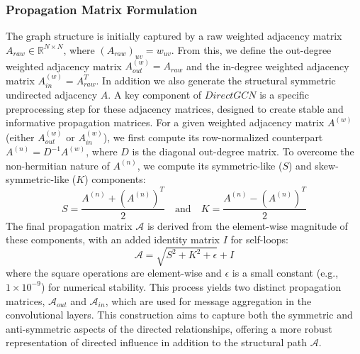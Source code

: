 \documentclass[utf8]{article}
\begin{document}
	\subsubsection{Propagation Matrix Formulation}
	The graph structure is initially captured by a raw weighted adjacency matrix $A_{raw} \in \mathbb{R}^{N \times N}$, where $(A_{raw})_{uv} = w_{uv}$. From this, we define the out-degree weighted adjacency matrix $A_{out}^{(w)} = A_{raw}$ and the in-degree weighted adjacency matrix $A_{in}^{(w)} = A_{raw}^T$. In addition we also generate the structural symmetric undirected adjacency $A$. A key component of $DirectGCN$ is a specific preprocessing step for these adjacency matrices, designed to create stable and informative propagation matrices. For a given weighted adjacency matrix $A^{(w)}$ (either $A_{out}^{(w)}$ or $A_{in}^{(w)}$), we first compute its row-normalized counterpart $A^{(n)} = D^{-1}A^{(w)}$, where $D$ is the diagonal out-degree matrix. To overcome the non-hermitian nature of $A^{(n)}$, we compute its symmetric-like ($S$) and skew-symmetric-like ($K$) components:
	\begin{equation}
		S = \frac{A^{(n)} + (A^{(n)})^T}{2} \quad \text{and} \quad K = \frac{A^{(n)} - (A^{(n)})^T}{2} 
	\end{equation}
	The final propagation matrix $\mathcal{A}$ is derived from the element-wise magnitude of these components, with an added identity matrix $I$ for self-loops:
	\begin{equation}
		\mathcal{A} = \sqrt{S^2 + K^2 + \epsilon} + I 
	\end{equation}
	where the square operations are element-wise and $\epsilon$ is a small constant (e.g., $1 \times 10^{-9}$) for numerical stability. This process yields two distinct propagation matrices, $\mathcal{A}_{out}$ and $\mathcal{A}_{in}$, which are used for message aggregation in the convolutional layers. This construction aims to capture both the symmetric and anti-symmetric aspects of the directed relationships, offering a more robust representation of directed influence in addition to the structural path $\mathcal{A}$.
	
\end{document}
